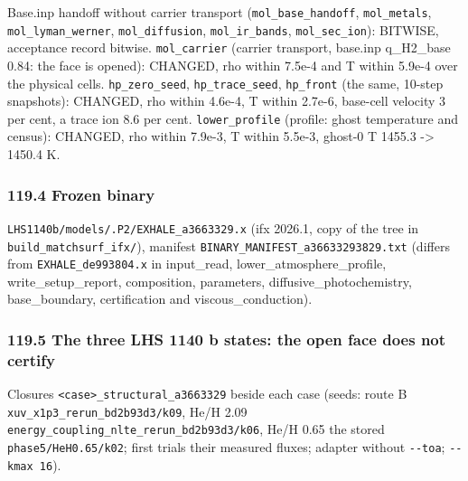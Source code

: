 \documentclass[english,a4paper]{my_memo}
\begin{document}
Base.inp handoff without carrier transport (\texttt{mol\_base\_handoff},
\texttt{mol\_metals}, \texttt{mol\_lyman\_werner}, \texttt{mol\_diffusion}, \texttt{mol\_ir\_bands},
\texttt{mol\_sec\_ion}): BITWISE, acceptance record bitwise. \texttt{mol\_carrier} (carrier
transport, base.inp q\_H2\_base 0.84: the face is opened): CHANGED, rho within
7.5e-4 and T within 5.9e-4 over the physical cells. \texttt{hp\_zero\_seed},
\texttt{hp\_trace\_seed}, \texttt{hp\_front} (the same, 10-step snapshots): CHANGED, rho within
4.6e-4, T within 2.7e-6, base-cell velocity 3 per cent, a trace ion 8.6 per
cent. \texttt{lower\_profile} (profile: ghost temperature and census): CHANGED, rho
within 7.9e-3, T within 5.5e-3, ghost-0 T 1455.3 -\textgreater{} 1450.4 K.

\subsubsection{119.4 Frozen binary}\label{1194-frozen-binary}

\texttt{LHS1140b/models/.P2/EXHALE\_a3663329.x} (ifx 2026.1, copy of the tree in
\texttt{build\_matchsurf\_ifx/}), manifest \texttt{BINARY\_MANIFEST\_a36633293829.txt}
(differs from \texttt{EXHALE\_de993804.x} in input\_read, lower\_atmosphere\_profile,
write\_setup\_report, composition, parameters, diffusive\_photochemistry,
base\_boundary, certification and viscous\_conduction).

\subsubsection{119.5 The three LHS 1140 b states: the open face does not certify}\label{1195-the-three-lhs-1140-b-states-the-open-face-does-not-certify}

Closures \texttt{\textless{}case\textgreater{}\_structural\_a3663329} beside each case (seeds: route B
\texttt{xuv\_x1p3\_rerun\_bd2b93d3/k09}, He/H 2.09 \texttt{energy\_coupling\_nlte\_rerun\_bd2b93d3/k06},
He/H 0.65 the stored \texttt{phase5/HeH0.65/k02}; first trials their measured
fluxes; adapter without \texttt{-\/-toa}; \texttt{-\/-kmax\ 16}).
\end{document}
